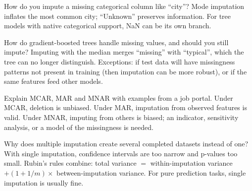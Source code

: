 \begin{qa}{ How do you impute a missing categorical column like ``city''?}
\why Mode imputation inflates the most common city; ``Unknown'' preserves information. For tree models with native categorical support, NaN
can be its own branch.
\end{qa}

\begin{qa}{ How do gradient-boosted trees handle missing values, and should you still impute?}
\why Imputing with the median merges ``missing'' with ``typical'', which the tree can no longer distinguish. Exceptions: if test data will have
missingness patterns not present in training (then imputation can be more robust), or if the same features feed other models.
\end{qa}

\begin{qa}{Explain MCAR, MAR and MNAR with examples from a job portal.}
\why Under MCAR, deletion is unbiased. Under MAR, imputation from observed features is valid. Under MNAR, imputing from others is biased; an
indicator, sensitivity analysis, or a model of the missingness is needed.
\end{qa}

\begin{qa}{\deep Why does multiple imputation create several completed datasets instead of one?}
\why With single imputation, confidence intervals are too narrow and p-values too small. Rubin's rules combine: total variance $=$ within-imputation
variance $+ (1 + 1/m)\times$ between-imputation variance. For pure prediction tasks, single imputation is usually fine.
\end{qa}

